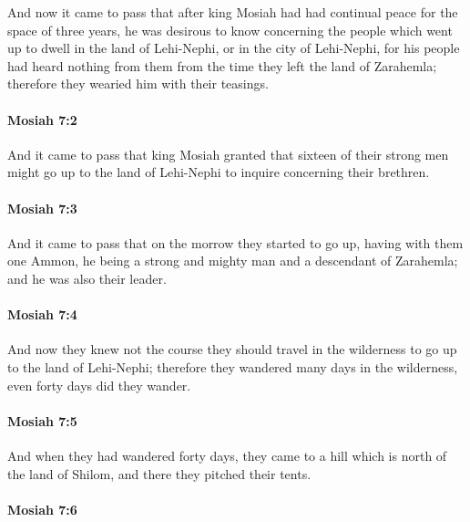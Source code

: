 			And now it came to pass that
			after king Mosiah had had continual peace for the space of three years,
			he was desirous to know concerning the people
			which went up to dwell in the land of Lehi-Nephi, or in the city of Lehi-Nephi,
			for his people had heard nothing from them
			from the time they left the land of Zarahemla;
			therefore they wearied him with their teasings.

		\paragraph{Mosiah 7:2} %
			\label{MOSIAH-7-2}

			And it came to pass that king Mosiah granted
			that sixteen of their strong men might go up to the land of Lehi-Nephi
			to inquire concerning their brethren.

		\paragraph{Mosiah 7:3} %
			\label{MOSIAH-7-3}

			And it came to pass that on the morrow they started to go up,
			having with them one Ammon,
			he being a strong and mighty man and a descendant of Zarahemla;
			and he was also their leader.

		\paragraph{Mosiah 7:4} %
			\label{MOSIAH-7-4}

			And now they knew not the course they should travel in the wilderness
			to go up to the land of Lehi-Nephi;
			therefore they wandered many days in the wilderness,
			even forty days did they wander.

		\paragraph{Mosiah 7:5} %
			\label{MOSIAH-7-5}

			And when they had wandered forty days,
			they came to a hill which is north of the land of Shilom,
			and there they pitched their tents.

		\paragraph{Mosiah 7:6} %
			\label{MOSIAH-7-6}

